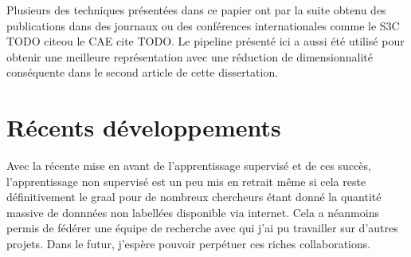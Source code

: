 Plusieurs des techniques présentées dans ce papier ont par la suite obtenu des
publications dans des journaux ou des conférences internationales comme le S3C
TODO citeou le CAE cite TODO. Le pipeline présenté ici a aussi été utilisé pour
obtenir une meilleure représentation avec une réduction de dimensionnalité
conséquente dans le second article de cette dissertation. 

\section{R\'{e}cents d\'{e}veloppements}

Avec la récente mise en avant de l'apprentissage supervisé et de ces succès,
l'apprentissage non supervisé est un peu mis en retrait même si cela reste
définitivement le graal pour de nombreux chercheurs étant donné la quantité
massive de donnnées non labellées disponible via internet. Cela a néanmoins
permis de fédérer une équipe de recherche avec qui j'ai pu travailler sur
d'autres projets. Dans le futur, j'espère pouvoir perpétuer ces riches
collaborations.
